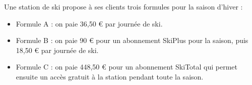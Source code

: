 \documentclass[exercice,a4]{thedocument}%
\begin{document}
%

\medskip

Une station de ski propose à ses clients trois formules pour la saison d'hiver :

\begin{itemize}
	\item Formule A : on paie 36,50 \euro{} par journée de ski.

	\item Formule B : on paie 90 \euro{} pour un abonnement \og SkiPlus \fg{} pour la saison, puis 18,50 \euro{} par journée de ski.

	\item Formule C : on paie 448,50 \euro{} pour un abonnement \og SkiTotal \fg{} qui permet ensuite un accès gratuit à la station pendant toute la saison.
\end{itemize}

\medskip
\end{document}
